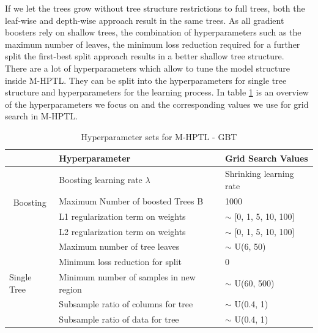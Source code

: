 \documentclass[12pt,titlepage]{article}
\begin{document}
If we let the trees grow without tree structure restrictions to full trees, both the leaf-wise and depth-wise approach result in the same trees. As all gradient boosters rely on shallow trees, the combination of hyperparameters such as the maximum number of leaves, the minimum loss reduction required for a further split the first-best split approach results in a better shallow tree structure. \\
There are a lot of hyperparameters which allow to tune the model structure inside M-HPTL. They can be split into the hyperparameters for single tree structure and hyperparameters for the learning process. In table \ref{hplgbm} is an overview of the hyperparameters we focus on and the corresponding values we use for grid search in M-HPTL. \\
\begin{table}[H]
    \centering
    \begin{tabular}{|c|l|l|}
    \hline
    \multicolumn{1}{|l|}{}                                       & Hyperparameter                            & Grid Search Values       \\
    \hline
    \multirow{4}{*}{\begin{sideways} Boosting \end{sideways}}                         & Boosting learning rate $\lambda$                                                                & Shrinking learning rate  \\
    & Maximum Number of boosted Trees B      &        1000                       \\
    & L1 regularization term on weights      &        $\sim$ [0, 1, 5, 10, 100]         \\
    & L2 regularization term on weights      &        $\sim$ [0, 1, 5, 10, 100]         \\
    \hline
    \multicolumn{1}{|l|}{\multirow{5}{*}{\begin{sideways} Single Tree \end{sideways}}} & Maximum number of tree leaves          &        $\sim$ U(6, 50)           \\
    \multicolumn{1}{|l|}{}                                       & Minimum loss reduction for split       &         0                 \\
    \multicolumn{1}{|l|}{}                                       & Minimum number of samples in new region   &      $\sim$ U(60, 500)         \\
    \multicolumn{1}{|l|}{}                                              & Subsample ratio of columns for tree    &     $\sim$ U(0.4, 1)         \\
    \multicolumn{1}{|l|}{}                                              & Subsample ratio of data for tree &          $\sim$ U(0.4, 1)            \\
    \hline
    \end{tabular}
    \caption{Hyperparameter sets for M-HPTL - GBT}
\label{hplgbm}
\end{table}
\end{document}
